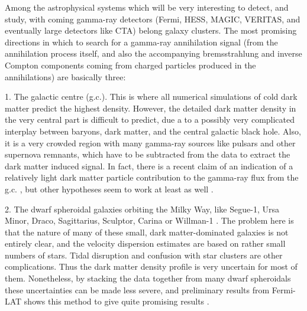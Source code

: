 \documentclass[10pt,aps,pra,reprint,amsmath,amsfonts,amssymb,showpacs]{revtex4-1}
\begin{document}
Among the astrophysical systems which will be very interesting to
detect, and study, with coming gamma-ray detectors (Fermi, HESS,
MAGIC, VERITAS, and eventually large detectors like CTA) belong galaxy
clusters. The most promising directions in which to search for a
gamma-ray annihilation signal (from the annihilation process itself,
and also the accompanying bremsstrahlung and inverse Compton
components coming from charged particles produced in the annihilations)
are basically three:

1. The galactic centre (g.c.). This is where all numerical simulations
of cold dark matter predict the highest density. However, the detailed
dark matter density in the very central part is difficult to predict,
due a to a possibly very complicated interplay between baryons, dark
matter, and the central galactic black hole. Also, it is a very
crowded region with many gamma-ray sources like pulsars and other
supernova remnants, which have to be subtracted from the data to
extract the dark matter induced signal. In fact, there is a recent
claim of an indication of a relatively light dark matter particle
contribution to the gamma-ray flux from the
g.c. \cite{2010arXiv1010.2752H}, but other hypotheses seem to work at
least as well \cite{2010arXiv1012.5839B}.

2. The dwarf spheroidal galaxies orbiting the Milky Way, like Segue-1,
Ursa Minor, Draco, Sagittarius, Sculptor, Carina or Willman-1
\cite{2009JCAP...01..016B,2010ApJ...720.1174A,2010JCAP...01..031S,2010JCAP...01..031S}. The
problem here is that the nature of many of these small, dark
matter-dominated galaxies is not entirely clear, and the velocity
dispersion estimates are based on rather small numbers of stars. Tidal
disruption and confusion with star clusters are other
complications. Thus the dark matter density profile is very uncertain
for most of them. Nonetheless, by stacking the data together from many
dwarf spheroidals these uncertainties can be made less severe, and
preliminary results from Fermi-LAT shows this method to give quite
promising results \cite{garde}.
\end{document}
